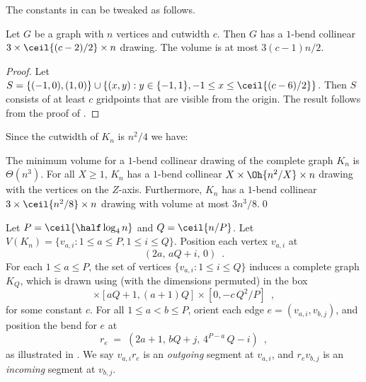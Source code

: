 \documentclass[10pt,a4paper]{article}
\begin{document}
The constants in   can be tweaked as follows.

\begin{lemma}
Let $G$ be a graph with $n$ vertices and cutwidth $c$.
Then $G$ has a $1$-bend collinear  $3\times\ceil{(c-2)/2}\times n$
drawing. The volume is at most $3(c-1)n/2$.
\end{lemma}


\begin{proof} Let $S=\{(-1,0),(1,0)\}\cup\{(x,y):y\in\{-1,1\},-1\leq x\leq
\ceil{(c-6)/2}\}$. Then $S$ consists of at least $c$ gridpoints that  are
visible from the origin.  The result follows from the proof of
. \end{proof}

Since the cutwidth of $K_n$ is $n^2/4$ we have:

\begin{corollary}
The minimum volume for a $1$-bend collinear drawing of the complete graph $K_n$ 
is $\Theta(n^3)$. For all $X\geq1$, $K_n$  has a $1$-bend collinear 
$X\times\Oh{n^2/X}\times n$ drawing with the vertices on the $Z$-axis.
Furthermore, $K_n$ has a $1$-bend collinear  
$3\times\ceil{n^2/8}\times n$ drawing with volume at most $3n^3/8$.\qed
\end{corollary}


Let $P=\ceil{\half\log_4n}$ and $Q=\ceil{n/P}$. Let $V(K_n)= \{ v_{a,i} : 1\leq
a\leq P, 1\leq i\leq Q\}$. Position each vertex $v_{a,i}$ at 
\begin{equation*}
(2a,\,aQ+i,\,0)\enspace.
\end{equation*}
For each $1\leq a\leq P$, the set of vertices $\{v_{a,i}:1\leq i\leq Q\}$
induces a complete graph $K_Q$, which is drawn 
using  (with the dimensions permuted) 
in  the box
\begin{equation*}
[2a,2a+P]\times[aQ+1,(a+1)Q]\times[0,-c\,Q^2/P]\enspace,
\end{equation*}
for some constant $c$. For all $1\leq a<b\leq P$,  orient each edge
$e=(v_{a,i},v_{b,j})$,  and position the bend for $e$ at 
\begin{equation*}
r_e\;=\;(2a+1,\,bQ+j,\,4^{P-a}\, Q-i)\enspace,
\end{equation*}
as illustrated in . We say $v_{a,i}r_e$ is an
\emph{outgoing} segment at $v_{a,i}$, and $r_ev_{b,j}$ is an \emph{incoming}
segment at $v_{b,j}$.
\end{document}
